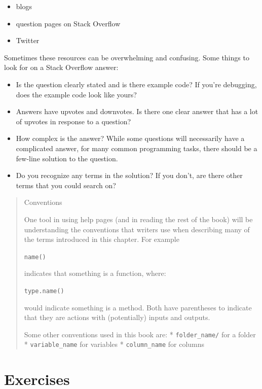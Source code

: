 \documentclass[]{Nemilov}
\providecommand{\tightlist}{%
  \setlength{\itemsep}{0pt}\setlength{\parskip}{0pt}}
\begin{document}
\begin{itemize}
\tightlist
\item
  blogs
\item
  question pages on Stack Overflow
\item
  Twitter
\end{itemize}

Sometimes these resources can be overwhelming and confusing. Some things to
look for on a Stack Overflow answer:

\begin{itemize}
\tightlist
\item
  Is the question clearly stated and is there example code? If you're
  debugging, does the example code look like yours?
\item
  Answers have upvotes and downvotes. Is there one clear answer that has a lot
  of upvotes in response to a question?
\item
  How complex is the answer? While some questions will necessarily have a
  complicated answer, for many common programming tasks, there should be a
  few-line solution to the question.
\item
  Do you recognize any terms in the solution? If you don't, are there other
  terms that you could search on?
\end{itemize}

\begin{quote}
Conventions

One tool in using help pages (and in reading the rest of the book) will
be understanding the conventions that writers use when describing
many of the terms introduced in this chapter. For example

\texttt{name()}

indicates that something is a function, where:

\texttt{type.name()}

would indicate something is a method. Both have parentheses to indicate
that they are actions with (potentially) inputs and outputs.

Some other conventions used in this book are:
* \texttt{folder\_name/} for a folder
* \texttt{variable\_name} for variables
* \texttt{column\_name} for columns
\end{quote}

\hypertarget{exercises}{%
\section{Exercises}\label{exercises}}
\end{document}
